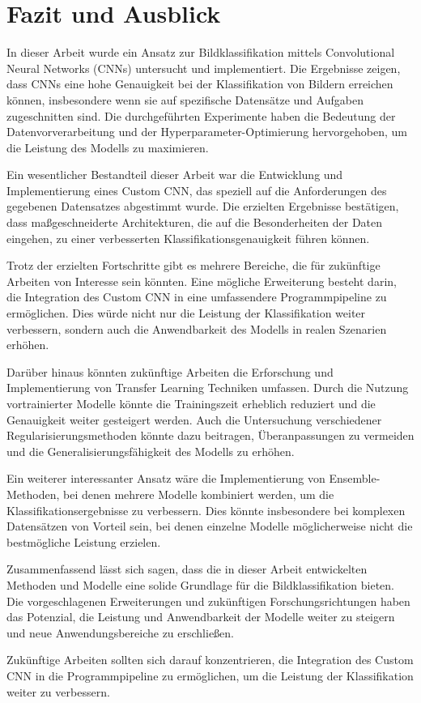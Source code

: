 
\chapter{Fazit und Ausblick} \label{chap:fazit_und_ausblick}

In dieser Arbeit wurde ein Ansatz zur Bildklassifikation mittels Convolutional Neural Networks (CNNs) untersucht und implementiert. Die Ergebnisse zeigen, dass CNNs eine hohe Genauigkeit bei der Klassifikation von Bildern erreichen können, insbesondere wenn sie auf spezifische Datensätze und Aufgaben zugeschnitten sind. Die durchgeführten Experimente haben die Bedeutung der Datenvorverarbeitung und der Hyperparameter-Optimierung hervorgehoben, um die Leistung des Modells zu maximieren.

Ein wesentlicher Bestandteil dieser Arbeit war die Entwicklung und Implementierung eines Custom CNN, das speziell auf die Anforderungen des gegebenen Datensatzes abgestimmt wurde. Die erzielten Ergebnisse bestätigen, dass maßgeschneiderte Architekturen, die auf die Besonderheiten der Daten eingehen, zu einer verbesserten Klassifikationsgenauigkeit führen können.

Trotz der erzielten Fortschritte gibt es mehrere Bereiche, die für zukünftige Arbeiten von Interesse sein könnten. Eine mögliche Erweiterung besteht darin, die Integration des Custom CNN in eine umfassendere Programmpipeline zu ermöglichen. Dies würde nicht nur die Leistung der Klassifikation weiter verbessern, sondern auch die Anwendbarkeit des Modells in realen Szenarien erhöhen.

Darüber hinaus könnten zukünftige Arbeiten die Erforschung und Implementierung von Transfer Learning Techniken umfassen. Durch die Nutzung vortrainierter Modelle könnte die Trainingszeit erheblich reduziert und die Genauigkeit weiter gesteigert werden. Auch die Untersuchung verschiedener Regularisierungsmethoden könnte dazu beitragen, Überanpassungen zu vermeiden und die Generalisierungsfähigkeit des Modells zu erhöhen.

Ein weiterer interessanter Ansatz wäre die Implementierung von Ensemble-Methoden, bei denen mehrere Modelle kombiniert werden, um die Klassifikationsergebnisse zu verbessern. Dies könnte insbesondere bei komplexen Datensätzen von Vorteil sein, bei denen einzelne Modelle möglicherweise nicht die bestmögliche Leistung erzielen.

Zusammenfassend lässt sich sagen, dass die in dieser Arbeit entwickelten Methoden und Modelle eine solide Grundlage für die Bildklassifikation bieten. Die vorgeschlagenen Erweiterungen und zukünftigen Forschungsrichtungen haben das Potenzial, die Leistung und Anwendbarkeit der Modelle weiter zu steigern und neue Anwendungsbereiche zu erschließen.

Zukünftige Arbeiten sollten sich darauf konzentrieren, die Integration des Custom CNN in die Programmpipeline zu ermöglichen, um die Leistung der Klassifikation weiter zu verbessern.
